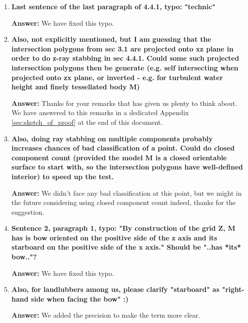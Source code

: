 \documentclass{article}
\newcommand{\answer}[1]{\textbf{\textcolor{answercolor}{Answer:}} \textcolor{answercolor}{#1}}
\begin{document}
\begin{enumerate}[label=\textbf{\arabic*.}]
	      \answer{The stabbing ray approach can encounter numerical errors when a ray hits a corner, potentially leading to misclassification of intersections, but this is mitigated by using a bounded interval and stable parameter numbering to ensure robustness.}

	\item \textbf{Last sentence of the last paragraph of 4.4.1, typo: "technic"}

	      \answer{We have fixed this typo.}

	\item \textbf{Also, not explicitly mentioned, but I am guessing that the intersection polygons from sec 3.1 are projected onto xz plane in order to do z-ray stabbing in sec 4.4.1. Could some such projected intersection polygons then be generate (e.g. self intersecting when projected onto zx plane, or inverted - e.g. for turbulent water height and finely tessellated body M)}

	      \answer{Thanks for your remarks that has given us plenty to think about. We have answered to this remarks in a dedicated Appendix \ref{sec:sketch_of_proof} at the end of this document.}


	\item \textbf{Also, doing ray stabbing on multiple components probably increases chances of bad classification of a point. Could do closed component count (provided the model M is a closed orientable surface to start with, so the intersection polygons have well-defined interior) to speed up the test.}

	      \answer{We didn't face any bad classification at this point, but we might in the future considering using closed component count indeed, thanks for the suggestion.}

	\item \textbf{Sentence 2, paragraph 1, typo: "By construction of the grid Z, M has is bow oriented on the positive side of the z axis and its starboard on the positive side of the x axis." Should be "..has *its* bow.."?}

	      \answer{We have fixed this typo.}


	\item \textbf{Also, for landlubbers among us, please clarify "starboard" as "right-hand side when facing the bow" :)}

	      \answer{We added the precision to make the term more clear.}



\end{enumerate}
\end{document}
